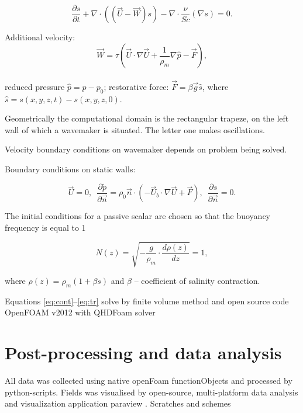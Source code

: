 \documentclass[a4wide,fontsize=12pt]{article}
\begin{document}
 \begin{equation}
     \frac{\partial s}{\partial t} + \nabla \cdot \left ( (\vec U - \vec W)s \right )
     - \nabla \cdot \frac{\nu}{Sc} \left ( \nabla s \right )=0.
     \label{eq:tr}
 \end{equation}


Additional velocity:  $$\vec W = \tau \left ( \vec U \cdot \nabla \vec U + \frac{1}{\rho_m} \nabla \hat p - \vec F  \right ),$$\\

reduced pressure $\hat p = p - p_0$; restorative force: $\vec{F}=\beta \vec{g} \hat s$, where $\hat s = s(x, y, z, t) - s(x, y, z, 0).$

Geometrically the computational domain is the rectangular trapeze, on the left wall of which a wavemaker is situated. The letter one makes oscillations. 

Velocity boundary conditions on wavemaker depends on problem being solved.

Boundary conditions on static walls:

\begin{equation}\label{eq:qhd_walls}
        \vec{U} = 0, \,\,\, \frac{\partial \tilde p}{ \partial \vec{n}} = \rho_0 \vec n \cdot \left ( -\vec U_b \cdot \nabla \vec U + \vec F \right), \,\,\, \frac{\partial s}{ \partial \vec{n}} = 0.
\end{equation}

The initial conditions for a passive scalar are chosen so that the buoyancy frequency is equal to 1

\begin{equation}
    N(z) = \sqrt{- \frac{g}{\rho_m}\cdot\frac{d \rho(z)}{dz}} = 1,
\end{equation}

where $\rho(z) = \rho_m(1+\beta s)$  and $\beta$ -- coefficient of salinity contraction. 



Equations \ref{eq:cont}--\ref{eq:tr} solve by finite volume method and open source code OpenFOAM v2012 with QHDFoam solver \cite{QGDFOam}

\section{Post-processing and data analysis}

All data was collected using native openFoam functionObjects and processed by python-scripts. Fields was visualised by open-source, multi-platform data analysis and visualization application paraview \cite{paraview}. Scratches and schemes 
\end{document}

